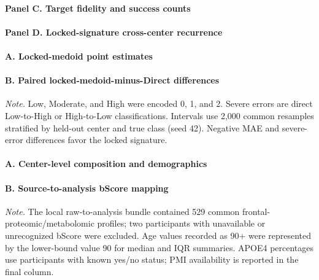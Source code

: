 

\paragraph*{Panel C. Target fidelity and success counts}



\paragraph*{Panel D. Locked-signature cross-center recurrence}



\paragraph*{A. Locked-medoid point estimates}



\paragraph*{B. Paired locked-medoid-minus-Direct differences}



{\footnotesize\noindent\textit{Note.} Low, Moderate, and High were encoded 0, 1, and 2. Severe errors are direct Low-to-High or High-to-Low classifications. Intervals use 2,000 common resamples stratified by held-out center and true class (seed 42). Negative MAE and severe-error differences favor the locked signature.\par}

\paragraph*{A. Center-level composition and demographics}



\paragraph*{B. Source-to-analysis bScore mapping}



{\footnotesize\noindent\textit{Note.} The local raw-to-analysis bundle contained 529 common frontal-proteomic/metabolomic profiles; two participants with unavailable or unrecognized bScore were excluded. Age values recorded as 90+ were represented by the lower-bound value 90 for median and IQR summaries. APOE4 percentages use participants with known yes/no status; PMI availability is reported in the final column.\par}

